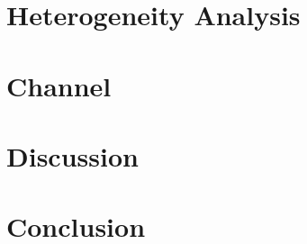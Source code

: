 \documentclass[11pt]{article}
\begin{document}
\newpage
\section{Heterogeneity Analysis}


\newpage
\section{Channel}



\newpage
\section{Discussion}


\newpage
\section{Conclusion}


\newpage



% 
\end{document}
